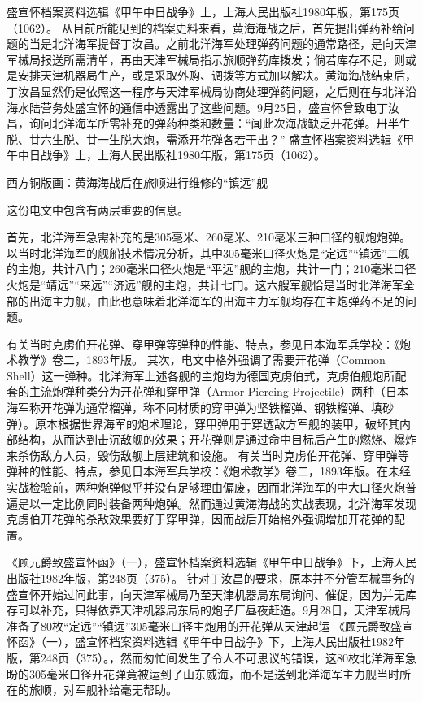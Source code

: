 \documentclass[12pt,UTF8]{ctexbook}
\begin{document}
盛宣怀档案资料选辑《甲午中日战争》上，上海人民出版社1980年版，第175页（1062）。
从目前所能见到的档案史料来看，黄海海战之后，首先提出弹药补给问题的当是北洋海军提督丁汝昌。之前北洋海军处理弹药问题的通常路径，是向天津军械局报送所需清单，再由天津军械局指示旅顺弹药库拨发；倘若库存不足，则或是安排天津机器局生产，或是采取外购、调拨等方式加以解决。黄海海战结束后，丁汝昌显然仍是依照这一程序与天津军械局协商处理弹药问题，之后则在与北洋沿海水陆营务处盛宣怀的通信中透露出了这些问题。9月25日，盛宣怀曾致电丁汝昌，询问北洋海军所需补充的弹药种类和数量：“闻此次海战缺乏开花弹。卅半生脱、廿六生脱、廿一生脱大炮，需添开花弹各若干出？” 盛宣怀档案资料选辑《甲午中日战争》上，上海人民出版社1980年版，第175页（1062）。


西方铜版画：黄海海战后在旅顺进行维修的“镇远”舰

这份电文中包含有两层重要的信息。

首先，北洋海军急需补充的是305毫米、260毫米、210毫米三种口径的舰炮炮弹。以当时北洋海军的舰船技术情况分析，其中305毫米口径火炮是“定远”“镇远”二舰的主炮，共计八门；260毫米口径火炮是“平远”舰的主炮，共计一门；210毫米口径火炮是“靖远”“来远”“济远”舰的主炮，共计七门。这六艘军舰恰是当时北洋海军全部的出海主力舰，由此也意味着北洋海军的出海主力军舰均存在主炮弹药不足的问题。

有关当时克虏伯开花弹、穿甲弹等弹种的性能、特点，参见日本海军兵学校：《炮术教学》卷二，1893年版。
其次，电文中格外强调了需要开花弹（Common Shell）这一弹种。北洋海军上述各舰的主炮均为德国克虏伯式，克虏伯舰炮所配套的主流炮弹种类分为开花弹和穿甲弹（Armor Piercing Projectile）两种（日本海军称开花弹为通常榴弹，称不同材质的穿甲弹为坚铁榴弹、钢铁榴弹、填砂弹）。原本根据世界海军的炮术理论，穿甲弹用于穿透敌方军舰的装甲，破坏其内部结构，从而达到击沉敌舰的效果；开花弹则是通过命中目标后产生的燃烧、爆炸来杀伤敌方人员，毁伤敌舰上层建筑和设施。 有关当时克虏伯开花弹、穿甲弹等弹种的性能、特点，参见日本海军兵学校：《炮术教学》卷二，1893年版。在未经实战检验前，两种炮弹似乎并没有足够理由偏废，因而北洋海军的中大口径火炮普遍是以一定比例同时装备两种炮弹。然而通过黄海海战的实战表现，北洋海军发现克虏伯开花弹的杀敌效果要好于穿甲弹，因而战后开始格外强调增加开花弹的配置。

《顾元爵致盛宣怀函》（一），盛宣怀档案资料选辑《甲午中日战争》下，上海人民出版社1982年版，第248页（375）。
针对丁汝昌的要求，原本并不分管军械事务的盛宣怀开始过问此事，向天津军械局乃至天津机器局东局询问、催促，因为并无库存可以补充，只得依靠天津机器局东局的炮子厂昼夜赶造。9月28日，天津军械局准备了80枚“定远”“镇远”305毫米口径主炮用的开花弹从天津起运 《顾元爵致盛宣怀函》（一），盛宣怀档案资料选辑《甲午中日战争》下，上海人民出版社1982年版，第248页（375）。，然而匆忙间发生了令人不可思议的错误，这80枚北洋海军急盼的305毫米口径开花弹竟被运到了山东威海，而不是送到北洋海军主力舰当时所在的旅顺，对军舰补给毫无帮助。
\end{document}
